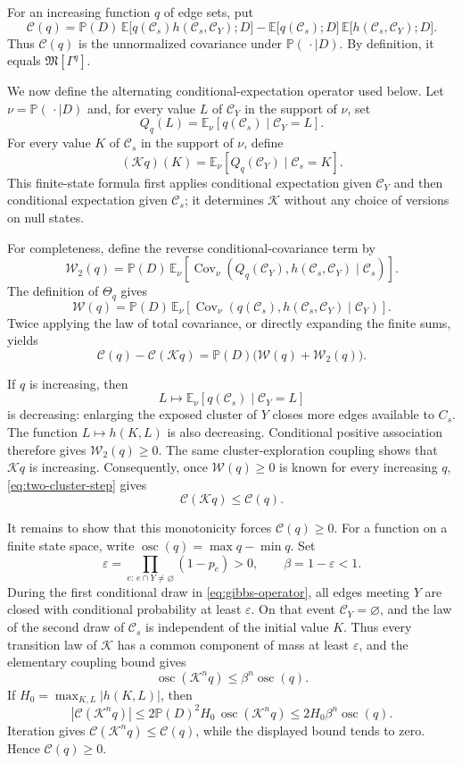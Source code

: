 \documentclass[11pt]{article}
\theoremstyle{definition}
\theoremstyle{remark}
\newcommand{\PP}{\mathbb P}
\newcommand{\EE}{\mathbb E}
\newcommand{\eC}{\mathcal C}
\DeclareMathOperator{\Cov}{Cov}
\newcommand{\Marg}{\mathfrak M}
\begin{document}
For an increasing function $q$ of edge sets, put
\[
 \mathcal C(q)=\PP(D)\,
   \EE\bigl[q(\eC_s)h(\eC_s,\eC_Y);D\bigr]
 -\EE\bigl[q(\eC_s);D\bigr]\,
  \EE\bigl[h(\eC_s,\eC_Y);D\bigr].
\]
Thus $\mathcal C(q)$ is the unnormalized covariance under $\PP(\,\cdot\mid D)$. By
definition, it equals $\Marg[\Gamma^q]$.

We now define the alternating conditional-expectation operator used below. Let
$\nu=\PP(\,\cdot\mid D)$ and, for every value $L$ of $\eC_Y$ in the support of $\nu$, set
\[
 Q_q(L)=\EE_\nu[q(\eC_s)\mid\eC_Y=L].
\]
For every value $K$ of $\eC_s$ in the support of $\nu$, define
\begin{equation}\label{eq:gibbs-operator}
 (\mathcal Kq)(K)=\EE_\nu[Q_q(\eC_Y)\mid\eC_s=K].
\end{equation}
This finite-state formula first applies conditional expectation given $\eC_Y$ and then
conditional expectation given $\eC_s$; it determines $\mathcal K$ without any choice of
versions on null states.

For completeness, define the reverse conditional-covariance term by
\[
 \mathcal W_2(q)=\PP(D)\,
 \EE_\nu\!\left[
 \Cov_\nu\!\left(Q_q(\eC_Y),h(\eC_s,\eC_Y)\mid\eC_s\right)\right].
\]
The definition of $\Theta_q$ gives
\[
 \mathcal W(q)=\PP(D)\,
 \EE_\nu\!\left[
 \Cov_\nu\!\left(q(\eC_s),h(\eC_s,\eC_Y)\mid\eC_Y\right)\right].
\]
Twice applying the law of total covariance, or directly expanding the finite sums, yields
\begin{equation}\label{eq:two-cluster-step}
 \mathcal C(q)-\mathcal C(\mathcal Kq)
 =\PP(D)\bigl(\mathcal W(q)+\mathcal W_2(q)\bigr).
\end{equation}

If $q$ is increasing, then
\[
 L\longmapsto\EE_\nu[q(\eC_s)\mid\eC_Y=L]
\]
is decreasing: enlarging the exposed cluster of $Y$ closes more edges available to
$C_s$. The function $L\mapsto h(K,L)$ is also decreasing. Conditional positive
association therefore gives $\mathcal W_2(q)\geq0$. The same cluster-exploration coupling
shows that $\mathcal Kq$ is increasing. Consequently, once $\mathcal W(q)\geq0$ is known
for every increasing $q$, \eqref{eq:two-cluster-step} gives
\[
 \mathcal C(\mathcal Kq)\leq\mathcal C(q).
\]

It remains to show that this monotonicity forces $\mathcal C(q)\geq0$. For a function on a
finite state space, write $\operatorname{osc}(q)=\max q-\min q$. Set
\[
 \varepsilon=\prod_{e:\,e\cap Y\neq\varnothing}(1-p_e)>0,
 \qquad \beta=1-\varepsilon<1.
\]
During the first conditional draw in \eqref{eq:gibbs-operator}, all edges meeting $Y$ are
closed with conditional probability at least $\varepsilon$. On that event
$\eC_Y=\varnothing$, and the law of the second draw of $\eC_s$ is independent of the
initial value $K$. Thus every transition law of $\mathcal K$ has a common component of
mass at least $\varepsilon$, and the elementary coupling bound gives
\[
 \operatorname{osc}(\mathcal K^nq)\leq
 \beta^n\operatorname{osc}(q).
\]
If $H_0=\max_{K,L}|h(K,L)|$, then
\[
 |\mathcal C(\mathcal K^nq)|
 \leq2\PP(D)^2H_0\,\operatorname{osc}(\mathcal K^nq)
 \leq2H_0\beta^n\operatorname{osc}(q).
\]
Iteration gives $\mathcal C(\mathcal K^nq)\leq\mathcal C(q)$, while the displayed bound
tends to zero. Hence $\mathcal C(q)\geq0$.
\end{document}
